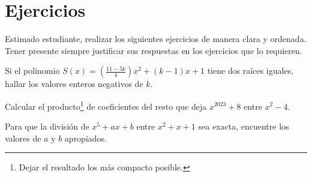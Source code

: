 \section*{Ejercicios}

Estimado estudiante, realizar los siguientes ejercicios de manera clara y ordenada.
Tener presente siempre justificar sus respuestas en los ejercicios que lo requieren.

\vspace{0.5cm}

\hline

\begin{exercise}
    Si el polinomio $S(x) = \left( \frac{11 - 5k}{4} \right) x^2 + (k - 1)x + 1$ tiene dos raíces iguales, hallar los valores enteros negativos de $k$.
\end{exercise}

\begin{exercise}
    Calcular el producto\footnote{Dejar el resultado los más compacto posible.} de coeficientes del resto que deja $x^{2023} + 8$ entre $x^2 - 4$.
\end{exercise}

\begin{exercise}
    Para que la división de $x^5 + ax + b$ entre $x^2 + x + 1$ sea exacta, encuentre los valores de $a$ y $b$ apropiados.
\end{exercise}

\hline
